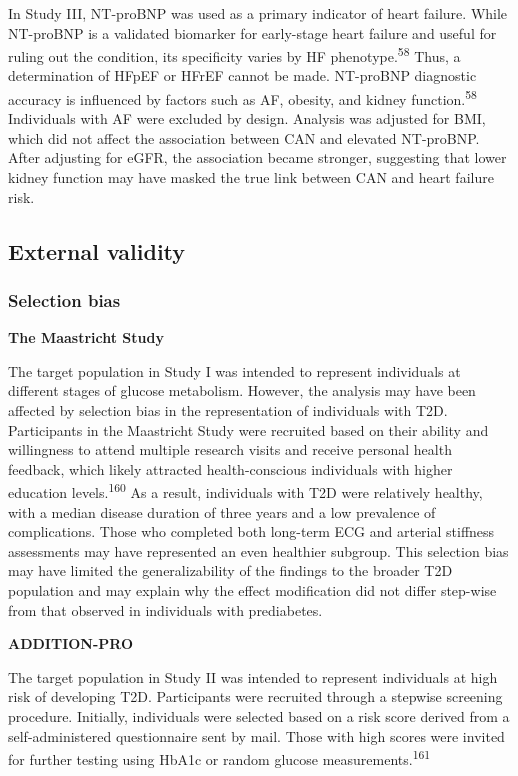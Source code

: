 \documentclass[
  a4paper,
  headsepline=true,
  open=left]{scrbook}
\begin{document}
In Study III, NT-proBNP was used as a primary indicator of heart
failure. While NT-proBNP is a validated biomarker for early-stage heart
failure and useful for ruling out the condition, its specificity varies
by HF phenotype.\textsuperscript{58} Thus, a determination of HFpEF or
HFrEF cannot be made. NT-proBNP diagnostic accuracy is influenced by
factors such as AF, obesity, and kidney function.\textsuperscript{58}
Individuals with AF were excluded by design. Analysis was adjusted for
BMI, which did not affect the association between CAN and elevated
NT-proBNP. After adjusting for eGFR, the association became stronger,
suggesting that lower kidney function may have masked the true link
between CAN and heart failure risk.

\hypertarget{external-validity}{%
\subsection{External validity}\label{external-validity}}

\hypertarget{selection-bias}{%
\subsubsection{Selection bias}\label{selection-bias}}

\textbf{The Maastricht Study}

The target population in Study I was intended to represent individuals
at different stages of glucose metabolism. However, the analysis may
have been affected by selection bias in the representation of
individuals with T2D. Participants in the Maastricht Study were
recruited based on their ability and willingness to attend multiple
research visits and receive personal health feedback, which likely
attracted health-conscious individuals with higher education
levels.\textsuperscript{160} As a result, individuals with T2D were
relatively healthy, with a median disease duration of three years and a
low prevalence of complications. Those who completed both long-term ECG
and arterial stiffness assessments may have represented an even
healthier subgroup. This selection bias may have limited the
generalizability of the findings to the broader T2D population and may
explain why the effect modification did not differ step-wise from that
observed in individuals with prediabetes.

\textbf{ADDITION-PRO}

The target population in Study II was intended to represent individuals
at high risk of developing T2D. Participants were recruited through a
stepwise screening procedure. Initially, individuals were selected based
on a risk score derived from a self-administered questionnaire sent by
mail. Those with high scores were invited for further testing using
HbA1c or random glucose measurements.\textsuperscript{161}
\end{document}
